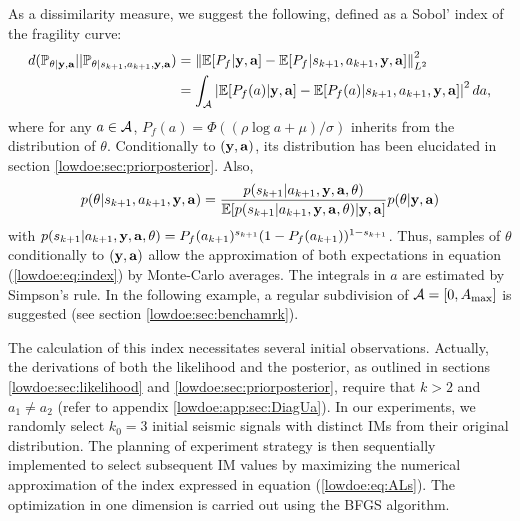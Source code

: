 As a dissimilarity measure, we suggest the following, defined as a  Sobol' index of the fragility curve:
    \begin{align}
    \nonumber
        d(\mathbb{P}_{\theta|\mathbf{y},\mathbf{a}} || \mathbb{P}_{\theta|s_{k+1},a_{k+1},\mathbf{y},\mathbf{a}} ) &= \left\|\mathbb{E}[P_f|\mathbf{y},\mathbf{a}]-\mathbb{E}[P_f|s_{k+1}, a_{k+1}, \mathbf{y},\mathbf{a}]\right\|_{L^2}^2\\
        &= \int_{\mathcal{A}}\left|\mathbb{E}[P_f(a)|\mathbf{y},\mathbf{a}]-\mathbb{E}[P_f(a)|s_{k+1}, a_{k+1}, \mathbf{y},\mathbf{a}]\right|^2d a ,\label{lowdoe:eq:index}
    \end{align}
where for any $a\in\mathcal{A}$, $P_f(a)=\Phi\left((\rho\log a+\mu)/\sigma\right)$ inherits from the distribution of $\theta$. {Conditionally to $(\mathbf{y},\mathbf{a})$, its distribution has been elucidated in section \ref{lowdoe:sec:priorposterior}. %
Also, 
\begin{equation}
    p(\theta|s_{k+1}, a_{k+1},\mbf y,\mbf a)  =  \frac{p(s_{k+1}|a_{k+1},\mbf y,\mbf a,\theta)}{\EE[ p(s_{k+1}|a_{k+1},\mbf y,\mbf a,\theta)|\mbf y,\mbf a]}%
        p(\theta|\mbf y,\mbf a)
\end{equation}
with $p(s_{k+1}|a_{k+1},\mathbf{y},\mathbf{a},\theta)=P_f(a_{k+1})^{s_{k+1}}(1-P_f(a_{k+1}))^{1-s_{k+1}}$. Thus, samples of $\theta$ conditionally to $(\mathbf{y},\mathbf{a})$ allow the approximation of both expectations in equation (\ref{lowdoe:eq:index}) by Monte-Carlo averages. The integrals in $a$ are estimated by Simpson's rule.
In the following example, a regular subdivision of $\mathcal{A}=[0,A_{\rm max}]$ is suggested (see section \ref{lowdoe:sec:benchamrk}).
}


{
The calculation of this index necessitates several initial observations. Actually, the derivations of both the likelihood and the posterior, as outlined in sections \ref{lowdoe:sec:likelihood} and \ref{lowdoe:sec:priorposterior}, require that $k > 2$ and $a_1 \ne a_2$ (refer to appendix \ref{lowdoe:app:sec:DiagUa}). In our experiments, we randomly select $k_0 = 3$ initial seismic signals with distinct IMs from their original distribution. The planning of experiment strategy is then sequentially implemented to select subsequent IM values by maximizing the numerical approximation of the index expressed in equation (\ref{lowdoe:eq:ALs}). The optimization in one dimension is carried out using the BFGS algorithm.
}




